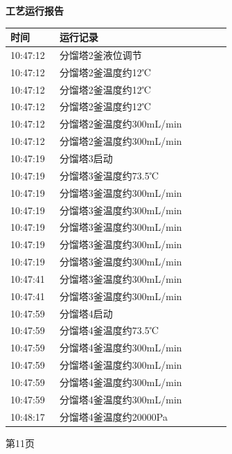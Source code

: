 \documentclass[UTF8,10pt,a4paper,fontset=fandol]{ctexart}
\begin{document}
\vspace{8mm}

\noindent
\begin{minipage}[t]{0.47\linewidth}
\centering
\textbf{工艺运行报告}

\vspace{2mm}
\scriptsize
\begin{tabular}{|p{0.20\linewidth}|p{0.70\linewidth}|}
\hline
时间 & 运行记录 \\ \hline
10:47:12 & 分馏塔2釜液位调节 \\ \hline
10:47:12 & 分馏塔2釜温度约12℃ \\ \hline
10:47:12 & 分馏塔2釜温度约12℃ \\ \hline
10:47:12 & 分馏塔2釜温度约12℃ \\ \hline
10:47:12 & 分馏塔2釜温度约300mL/min \\ \hline
10:47:12 & 分馏塔2釜温度约300mL/min \\ \hline
10:47:19 & 分馏塔3启动 \\ \hline
10:47:19 & 分馏塔3釜温度约73.5℃ \\ \hline
10:47:19 & 分馏塔3釜温度约300mL/min \\ \hline
10:47:19 & 分馏塔3釜温度约300mL/min \\ \hline
10:47:19 & 分馏塔3釜温度约300mL/min \\ \hline
10:47:19 & 分馏塔3釜温度约300mL/min \\ \hline
10:47:19 & 分馏塔3釜温度约300mL/min \\ \hline
10:47:41 & 分馏塔3釜温度约300mL/min \\ \hline
10:47:41 & 分馏塔3釜温度约300mL/min \\ \hline
10:47:59 & 分馏塔4启动 \\ \hline
10:47:59 & 分馏塔4釜温度约73.5℃ \\ \hline
10:47:59 & 分馏塔4釜温度约300mL/min \\ \hline
10:47:59 & 分馏塔4釜温度约300mL/min \\ \hline
10:47:59 & 分馏塔4釜温度约300mL/min \\ \hline
10:47:59 & 分馏塔4釜温度约300mL/min \\ \hline
10:48:17 & 分馏塔4釜温度约20000Pa \\ \hline
\end{tabular}

\vspace{1mm}

第11页
\end{minipage}
\hfill
\end{document}
